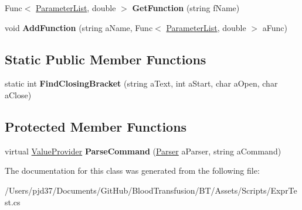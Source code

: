 \begin{DoxyCompactItemize}
\item 
Func$<$ \hyperlink{class_b83_1_1_logic_expression_parser_1_1_parameter_list}{Parameter\+List}, double $>$ {\bfseries Get\+Function} (string f\+Name)\hypertarget{class_b83_1_1_logic_expression_parser_1_1_parsing_context_a3e0e109926fa0262fde0ad6e5701308c}{}\label{class_b83_1_1_logic_expression_parser_1_1_parsing_context_a3e0e109926fa0262fde0ad6e5701308c}

\item 
void {\bfseries Add\+Function} (string a\+Name, Func$<$ \hyperlink{class_b83_1_1_logic_expression_parser_1_1_parameter_list}{Parameter\+List}, double $>$ a\+Func)\hypertarget{class_b83_1_1_logic_expression_parser_1_1_parsing_context_ad066d6fd31d2c216d4f17f6526752fcc}{}\label{class_b83_1_1_logic_expression_parser_1_1_parsing_context_ad066d6fd31d2c216d4f17f6526752fcc}

\end{DoxyCompactItemize}
\subsection*{Static Public Member Functions}
\begin{DoxyCompactItemize}
\item 
static int {\bfseries Find\+Closing\+Bracket} (string a\+Text, int a\+Start, char a\+Open, char a\+Close)\hypertarget{class_b83_1_1_logic_expression_parser_1_1_parsing_context_a1aa6db8f6a23f248b008bc33ef3f8fb7}{}\label{class_b83_1_1_logic_expression_parser_1_1_parsing_context_a1aa6db8f6a23f248b008bc33ef3f8fb7}

\end{DoxyCompactItemize}
\subsection*{Protected Member Functions}
\begin{DoxyCompactItemize}
\item 
virtual \hyperlink{class_b83_1_1_logic_expression_parser_1_1_value_provider}{Value\+Provider} {\bfseries Parse\+Command} (\hyperlink{class_b83_1_1_logic_expression_parser_1_1_parser}{Parser} a\+Parser, string a\+Command)\hypertarget{class_b83_1_1_logic_expression_parser_1_1_parsing_context_aeae4de9b730b05b0f344ff32e7379bcb}{}\label{class_b83_1_1_logic_expression_parser_1_1_parsing_context_aeae4de9b730b05b0f344ff32e7379bcb}

\end{DoxyCompactItemize}


The documentation for this class was generated from the following file\+:\begin{DoxyCompactItemize}
\item 
/\+Users/pjd37/\+Documents/\+Git\+Hub/\+Blood\+Transfusion/\+B\+T/\+Assets/\+Scripts/Expr\+Test.\+cs\end{DoxyCompactItemize}
